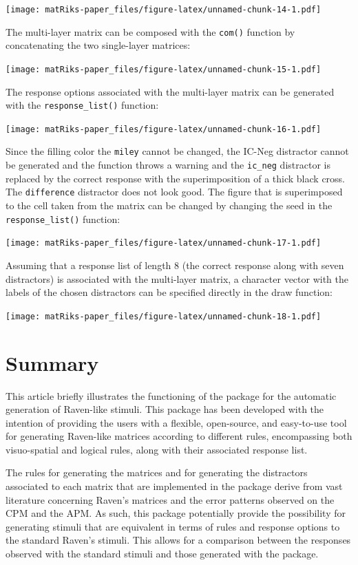 \texttt{[image: matRiks-paper\_files/figure-latex/unnamed-chunk-14-1.pdf]}

The multi-layer matrix can be composed with the \texttt{com()} function by concatenating the two single-layer matrices:

\texttt{[image: matRiks-paper\_files/figure-latex/unnamed-chunk-15-1.pdf]}

The response options associated with the multi-layer matrix can be generated with the \texttt{response\_list()} function:

\texttt{[image: matRiks-paper\_files/figure-latex/unnamed-chunk-16-1.pdf]}

Since the filling color the \texttt{miley} cannot be changed, the IC-Neg distractor cannot be generated and the function throws a warning and the \texttt{ic\_neg} distractor is replaced by the correct response with the superimposition of a thick black cross.
The \texttt{difference} distractor does not look good.
The figure that is superimposed to the cell taken from the matrix can be changed by changing the seed in the \texttt{response\_list()} function:

\texttt{[image: matRiks-paper\_files/figure-latex/unnamed-chunk-17-1.pdf]}

Assuming that a response list of length 8 (the correct response along with seven distractors) is associated with the multi-layer matrix, a character vector with the labels of the chosen distractors can be specified directly in the draw function:

\texttt{[image: matRiks-paper\_files/figure-latex/unnamed-chunk-18-1.pdf]}

\section{Summary}\label{summary}

This article briefly illustrates the functioning of the  package for the automatic generation of Raven-like stimuli.
This package has been developed with the intention of providing the users with a flexible, open-source, and easy-to-use tool for generating Raven-like matrices according to different rules, encompassing both visuo-spatial and logical rules, along with their associated response list.

The rules for generating the matrices and for generating the distractors associated to each matrix that are implemented in the  package derive from vast literature concerning Raven's matrices and the error patterns observed on the CPM and the APM.
As such, this package potentially provide the possibility for generating stimuli that are equivalent in terms of rules and response options to the standard Raven's stimuli.
This allows for a comparison between the responses observed with the standard stimuli and those generated with the package.

